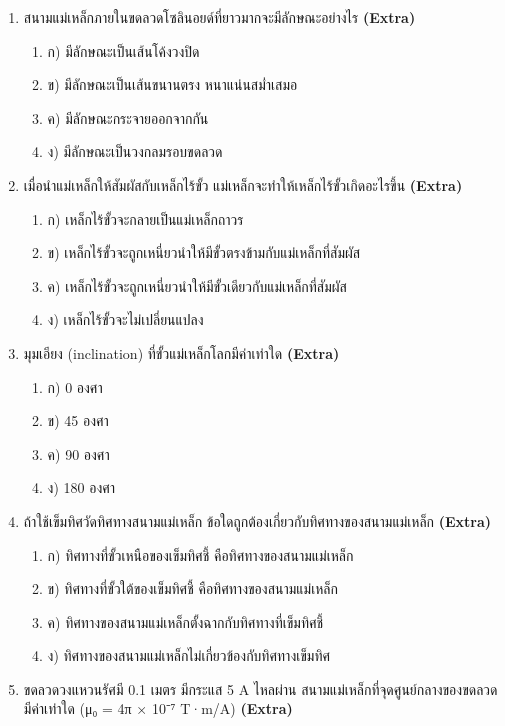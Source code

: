 \documentclass[12pt]{article}
\begin{document}
\begin{enumerate}[label=\arabic*.]
\item สนามแม่เหล็กภายในขดลวดโซลินอยด์ที่ยาวมากจะมีลักษณะอย่างไร \hfill \textbf{\small (Extra)}
\begin{enumerate}[label=)]
\item ก) มีลักษณะเป็นเส้นโค้งวงปิด
\item ข) มีลักษณะเป็นเส้นขนานตรง หนาแน่นสม่ำเสมอ
\item ค) มีลักษณะกระจายออกจากกัน
\item ง) มีลักษณะเป็นวงกลมรอบขดลวด
\end{enumerate}
\item เมื่อนำแม่เหล็กให้สัมผัสกับเหล็กไร้ขั้ว แม่เหล็กจะทำให้เหล็กไร้ขั้วเกิดอะไรขึ้น \hfill \textbf{\small (Extra)}
\begin{enumerate}[label=)]
\item ก) เหล็กไร้ขั้วจะกลายเป็นแม่เหล็กถาวร
\item ข) เหล็กไร้ขั้วจะถูกเหนี่ยวนำให้มีขั้วตรงข้ามกับแม่เหล็กที่สัมผัส
\item ค) เหล็กไร้ขั้วจะถูกเหนี่ยวนำให้มีขั้วเดียวกับแม่เหล็กที่สัมผัส
\item ง) เหล็กไร้ขั้วจะไม่เปลี่ยนแปลง
\end{enumerate}
\item มุมเอียง (inclination) ที่ขั้วแม่เหล็กโลกมีค่าเท่าใด \hfill \textbf{\small (Extra)}
\begin{enumerate}[label=)]
\item ก) 0 องศา
\item ข) 45 องศา
\item ค) 90 องศา
\item ง) 180 องศา
\end{enumerate}
\item ถ้าใช้เข็มทิศวัดทิศทางสนามแม่เหล็ก ข้อใดถูกต้องเกี่ยวกับทิศทางของสนามแม่เหล็ก \hfill \textbf{\small (Extra)}
\begin{enumerate}[label=)]
\item ก) ทิศทางที่ขั้วเหนือของเข็มทิศชี้ คือทิศทางของสนามแม่เหล็ก
\item ข) ทิศทางที่ขั้วใต้ของเข็มทิศชี้ คือทิศทางของสนามแม่เหล็ก
\item ค) ทิศทางของสนามแม่เหล็กตั้งฉากกับทิศทางที่เข็มทิศชี้
\item ง) ทิศทางของสนามแม่เหล็กไม่เกี่ยวข้องกับทิศทางเข็มทิศ
\end{enumerate}
\item ขดลวดวงแหวนรัศมี 0.1 เมตร มีกระแส 5 A ไหลผ่าน สนามแม่เหล็กที่จุดศูนย์กลางของขดลวดมีค่าเท่าใด (μ₀ = 4π × 10⁻⁷ T·m/A) \hfill \textbf{\small (Extra)}
\begin{enumerate}[label=)]

\end{enumerate}
\end{enumerate}
\end{document}

